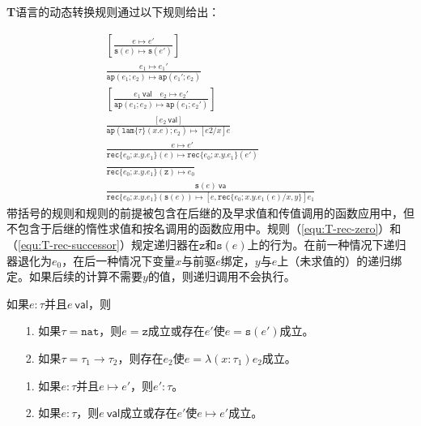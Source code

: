 \textbf{T}语言的动态转换规则通过以下规则给出：

\begin{subequations}
\begin{gather}
\left[\frac{e\longmapsto e'}{\mathtt{s}(e)\longmapsto\mathtt{s}(e')}\right]\\
\frac{e_1\longmapsto e_1 '}{\mathtt{ap}(e_1;e_2)\longmapsto\mathtt{ap}(e_1 ';e_2)}\\
\left[\frac{e_1\ \mathsf{val}\quad e_2\longmapsto e_2'}{\mathtt{ap}(e_1;e_2)\longmapsto\mathtt{ap}(e_1;e_2')}\right]\\
\frac{[e_2\ \mathsf{val}]}{\mathtt{ap}(\mathtt{lam}\{\tau\}(x.e);e_2)\longmapsto[e2/x]e}\\
\frac{e\longmapsto e'}{\mathtt{rec}\{e_0;x.y.e_1\}(e)\longmapsto\mathtt{rec}\{e_0;x.y.e_1\}(e')}\\
\label{equ:T-rec-zero}\frac{}{\mathtt{rec}\{e_0;x.y.e_1\}(\mathtt{z})\longmapsto e_0}\\
\label{equ:T-rec-successor}\frac{\mathtt{s}(e)\ \mathsf{va}}{\mathtt{rec}\{e_0;x.y.e_1\}(\mathtt{s}(e))\longmapsto[e,\mathtt{rec}\{e_0;x.y.e_1(e)/x,y\}]e_1}
\end{gather}
\end{subequations}
带括号的规则和规则的前提被包含在后继的及早求值和传值调用的函数应用中，但不包含于后继的惰性求值和按名调用的函数应用中。规则（\ref{equ:T-rec-zero}）和（\ref{equ:T-rec-successor}）规定递归器在$\mathtt{z}$和$\mathtt{s}(e)$上的行为。在前一种情况下递归器退化为$e_0$，在后一种情况下变量$x$与前驱$e$绑定，$y$与$e$上（未求值的）的递归绑定。如果后续的计算不需要$y$的值，则递归调用不会执行。

\begin{lemma}[范式]\label{lemma:T-canonical-form}
如果$e:\tau$并且$e\ \mathsf{val}$，则
\begin{itemize}
\item[1.] 如果$\tau=\mathtt{nat}$，则$e=\mathtt{z}$成立或存在$e'$使$e=\mathtt{s}(e')$成立。
\item[2.] 如果$\tau=\tau_1\to\tau_2$，则存在$e_2$使$e=\lambda(x:\tau_1)e_2$成立。
\end{itemize}
\end{lemma}

\begin{theorem}[安全性]\label{theorem:T-safety}
\begin{itemize}
\item[1.] 如果$e:\tau$并且$e\longmapsto e'$，则$e':\tau$。
\item[2.] 如果$e:\tau$，则$e\ \mathsf{val}$成立或存在$e'$使$e\longmapsto e'$成立。
\end{itemize}
\end{theorem}

